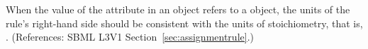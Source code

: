 When the value of the attribute  in an \AssignmentRule
object refers to a \SpeciesReference object, the units of the rule's
right-hand side should be consistent with the units of stoichiometry, that
is, .  (References: SBML L3V1
Section~\ref{sec:assignmentrule}.)
